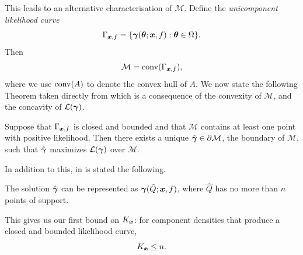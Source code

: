 	This leads to an alternative characterisation of $\mathcal{M}$. Define the \emph{unicomponent likelihood curve}
	\begin{equation}
		\Gamma_{{\bm{{x}}}, f} = \{{\bm{{\gamma}}}({\bm{{\theta}}}; {\bm{{x}}}, f) : {\bm{{\theta}}} \in \Omega\}.
	\end{equation}
	Then
	\begin{equation}
		\mathcal{M} = \mathrm{conv}(\Gamma_{{\bm{{x}}}, f}),
	\end{equation}
	where we use $\mathrm{conv}(A)$ to denote the convex hull of $A$. We now state the following Theorem taken directly from \cite[Theorem 18]{Lindsay1995-sq} which is a consequence of the convexity of $\mathcal{M}$, and the concavity of $\mathcal{L}({\bm{{\gamma}}})$.

	\begin{theorem}
		Suppose that $\Gamma_{{\bm{{x}}}, f}$ is closed and bounded and that $\mathcal{M}$ contains at least one point with positive likelihood. Then there exists a unique $\hat{{\bm{{\gamma}}}} \in \partial \mathcal{M}$, the boundary of $\mathcal{M}$, such that $\hat{{\bm{{\gamma}}}}$ maximizes $\mathcal{L}({\bm{{\gamma}}})$ over $\mathcal{M}$.
		\label{thm: lindsay maximizing likelihood vector point}
	\end{theorem}

	In addition to this, in \cite[Theorem 21]{Lindsay1995-sq} is stated the following.
	\begin{theorem}
		The solution $\hat{{\bm{{\gamma}}}}$ can be represented as ${\bm{{\gamma}}}(\hat{Q};{\bm{{x}}}, f)$, where $\hat{Q}$ has no more than $n$ points of support.
		\label{thm: lindsay no more than n points}
	\end{theorem}
	This gives us our first bound on $K_{\bm{{x}}}$: for component densities that produce a closed and bounded likelihood curve,
	\begin{equation}
		K_{\bm{{x}}} \leq n.
	\end{equation}

